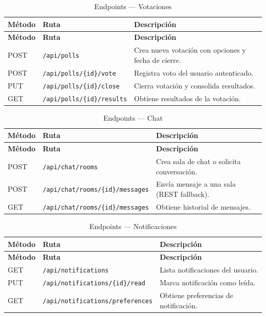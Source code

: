 \begin{longtable}{|p{}|p{}|p{}|}
\caption{Endpoints --- Votaciones}\label{tab:ep-polls}\\
\hline
\textbf{Método} & \textbf{Ruta} & \textbf{Descripción} \\
\hline
\endfirsthead
\hline \textbf{Método} & \textbf{Ruta} & \textbf{Descripción} \\ \hline
\endhead
\hline \endfoot

POST & \texttt{/api/polls} & Crea nueva votación con opciones y fecha de cierre. \\
\hline
POST & \texttt{/api/polls/\{id\}/vote} & Registra voto del usuario autenticado. \\
\hline
PUT & \texttt{/api/polls/\{id\}/close} & Cierra votación y consolida resultados. \\
\hline
GET & \texttt{/api/polls/\{id\}/results} & Obtiene resultados de la votación. \\

\end{longtable}

\begin{longtable}{|p{}|p{}|p{}|}
\caption{Endpoints --- Chat}\label{tab:ep-chat}\\
\hline
\textbf{Método} & \textbf{Ruta} & \textbf{Descripción} \\
\hline
\endfirsthead
\hline \textbf{Método} & \textbf{Ruta} & \textbf{Descripción} \\ \hline
\endhead
\hline \endfoot

POST & \texttt{/api/chat/rooms} & Crea sala de chat o solicita conversación. \\
\hline
POST & \texttt{/api/chat/rooms/\{id\}/messages} & Envía mensaje a una sala (REST fallback). \\
\hline
GET & \texttt{/api/chat/rooms/\{id\}/messages} & Obtiene historial de mensajes. \\

\end{longtable}

\begin{longtable}{|p{}|p{}|p{}|}
\caption{Endpoints --- Notificaciones}\label{tab:ep-notifications}\\
\hline
\textbf{Método} & \textbf{Ruta} & \textbf{Descripción} \\
\hline
\endfirsthead
\hline \textbf{Método} & \textbf{Ruta} & \textbf{Descripción} \\ \hline
\endhead
\hline \endfoot

GET & \texttt{/api/notifications} & Lista notificaciones del usuario. \\
\hline
PUT & \texttt{/api/notifications/\{id\}/read} & Marca notificación como leída. \\
\hline
GET & \texttt{/api/notifications/preferences} & Obtiene preferencias de notificación. \\

\end{longtable}


